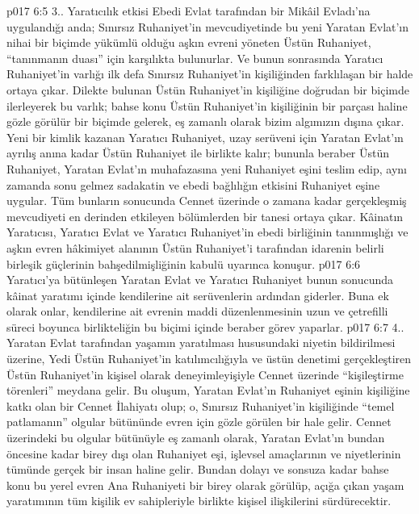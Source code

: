 \vs p017 6:5 3.\bibnobreakspace {}. Yaratıcılık etkisi Ebedi Evlat tarafından bir Mikâil Evladı’na uygulandığı anda; Sınırsız Ruhaniyet’in mevcudiyetinde bu yeni Yaratan Evlat’ın nihai bir biçimde yükümlü olduğu aşkın evreni yöneten Üstün Ruhaniyet, “tanınmanın duası” için karşılıkta bulunurlar. Ve bunun sonrasında Yaratıcı Ruhaniyet’in varlığı ilk defa Sınırsız Ruhaniyet’in kişiliğinden farklılaşan bir halde ortaya çıkar. Dilekte bulunan Üstün Ruhaniyet’in kişiliğine doğrudan bir biçimde ilerleyerek bu varlık; bahse konu Üstün Ruhaniyet’in kişiliğinin bir parçası haline gözle görülür bir biçimde gelerek, eş zamanlı olarak bizim algımızın dışına çıkar. Yeni bir kimlik kazanan Yaratıcı Ruhaniyet, uzay serüveni için Yaratan Evlat’ın ayrılış anına kadar Üstün Ruhaniyet ile birlikte kalır; bununla beraber Üstün Ruhaniyet, Yaratan Evlat’ın muhafazasına yeni Ruhaniyet eşini teslim edip, aynı zamanda sonu gelmez sadakatin ve ebedi bağlılığın etkisini Ruhaniyet eşine uygular. Tüm bunların sonucunda Cennet üzerinde o zamana kadar gerçekleşmiş mevcudiyeti en derinden etkileyen bölümlerden bir tanesi ortaya çıkar. Kâinatın Yaratıcısı, Yaratıcı Evlat ve Yaratıcı Ruhaniyet’in ebedi birliğinin tanınmışlığı ve aşkın evren hâkimiyet alanının Üstün Ruhaniyet’i tarafından idarenin belirli birleşik güçlerinin bahşedilmişliğinin kabulü uyarınca konuşur.
\vs p017 6:6 Yaratıcı’ya bütünleşen Yaratan Evlat ve Yaratıcı Ruhaniyet bunun sonucunda kâinat yaratımı içinde kendilerine ait serüvenlerin ardından giderler. Buna ek olarak onlar, kendilerine ait evrenin maddi düzenlenmesinin uzun ve çetrefilli süreci boyunca birlikteliğin bu biçimi içinde beraber görev yaparlar.
\vs p017 6:7 4.\bibnobreakspace {}. Yaratan Evlat tarafından yaşamın yaratılması hususundaki niyetin bildirilmesi üzerine, Yedi Üstün Ruhaniyet’in katılımcılığıyla ve üstün denetimi gerçekleştiren Üstün Ruhaniyet’in kişisel olarak deneyimleyişiyle Cennet üzerinde “kişileştirme törenleri” meydana gelir. Bu oluşum, Yaratan Evlat’ın Ruhaniyet eşinin kişiliğine katkı olan bir Cennet İlahiyatı olup; o, Sınırsız Ruhaniyet’in kişiliğinde “temel patlamanın” olgular bütününde evren için gözle görülen bir hale gelir. Cennet üzerindeki bu olgular bütünüyle eş zamanlı olarak, Yaratan Evlat’ın bundan öncesine kadar birey dışı olan Ruhaniyet eşi, işlevsel amaçlarının ve niyetlerinin tümünde gerçek bir insan haline gelir. Bundan dolayı ve sonsuza kadar bahse konu bu yerel evren Ana Ruhaniyeti bir birey olarak görülüp, açığa çıkan yaşam yaratımının tüm kişilik ev sahipleriyle birlikte kişisel ilişkilerini sürdürecektir.
